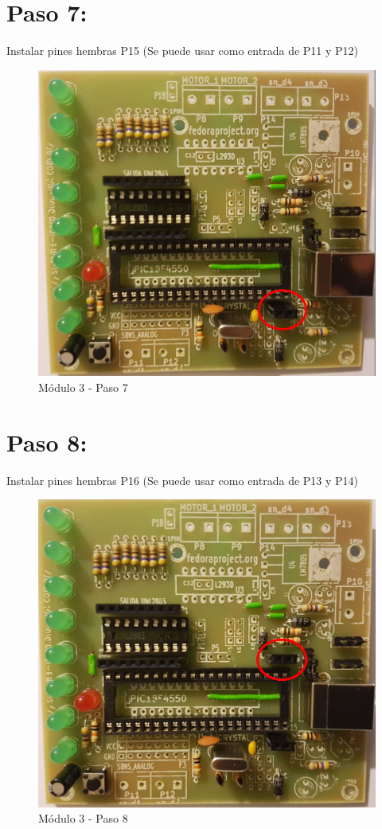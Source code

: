 \newpage

\section{Paso 7:}

Instalar pines hembras P15 (Se puede usar como entrada de P11 y P12)

\begin{figure}[h]
	\centering
	\includegraphics[width=0.8\linewidth]{Modulo_3/M3_7}
	\caption{Módulo 3 - Paso 7}
	\label{fig:M3_7}
\end{figure}

\newpage

\section{Paso 8:}

Instalar pines hembras P16 (Se puede usar como entrada de P13 y P14)

\begin{figure}[h]
	\centering
	\includegraphics[width=0.8\linewidth]{Modulo_3/M3_8}
	\caption{Módulo 3 - Paso 8}
	\label{fig:M3_8}
\end{figure}

